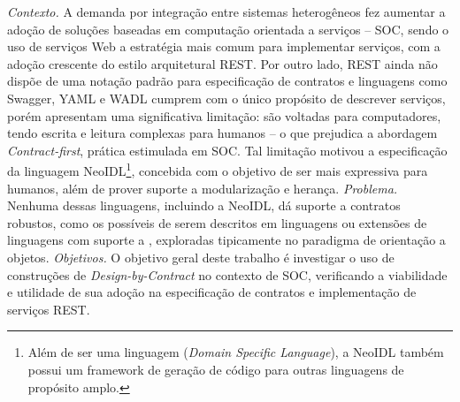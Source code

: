
\vspace{5mm}

 
\vspace{5mm} 






\emph{Contexto.}
A demanda por integração entre sistemas heterogêneos fez aumentar a adoção de
soluções baseadas em computação orientada a serviços -- SOC, sendo o uso de
serviços Web a estratégia mais comum para implementar serviços, com a adoção crescente do estilo arquitetural REST.
Por outro lado, REST ainda não dispõe de uma notação padrão para especificação
de contratos e linguagens como Swagger, YAML e WADL cumprem com o
único propósito de descrever serviços, porém apresentam uma significativa
limitação: são voltadas para computadores, tendo escrita e leitura complexas para
humanos -- o que prejudica a abordagem \textit{Contract-first}, prática
estimulada em SOC. Tal limitação motivou a especificação da
linguagem NeoIDL\footnote{Além de ser uma linguagem (\textit{Domain Specific
Language}), a NeoIDL também possui um framework de geração de código para outras linguagens de propósito
amplo.}, concebida com o objetivo de ser mais expressiva para humanos,
além de prover suporte a modula\-ri\-za\-ção e herança.
\emph{Problema.} Nenhuma dessas linguagens, incluindo a NeoIDL, dá
suporte a contratos robustos, como os possíveis de serem descritos em
linguagens ou extensões de linguagens com suporte a \designbycontract{},
exploradas tipicamente no paradigma de orientação a objetos.
\emph{Objetivos.}
O objetivo geral deste trabalho é investigar o uso de construções de
\textit{Design-by-Contract} no contexto de SOC,
verificando a viabilidade e utilidade de sua adoção na especificação de
contratos e implementação de serviços REST.
%
